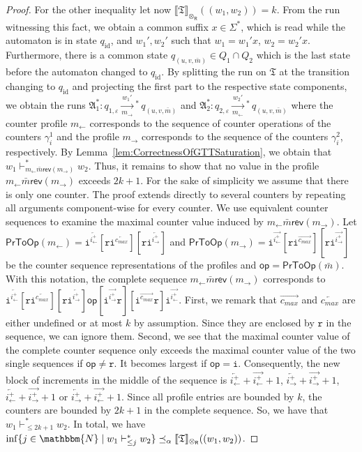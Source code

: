 \documentclass{LMCS}
\newcommand{\apathS}[2][]{\xrightarrow[#1]{#2}\!\!{}^*\,}
\newcommand{\nat}{\mathbbm{N}}
\newcommand{\eps}{\varepsilon}
\newcommand{\automatonA}{\mathfrak A}
\newcommand{\automatonT}{\mathfrak T}
\newcommand{\semantics}[1]{\llbracket#1\rrbracket}
\newcommand{\costlea}[1][\alpha]{\preceq_{#1}}
\newcommand{\ipl}{i^{+}_{\leftarrow}}
\newcommand{\ipr}{i^{+}_{\rightarrow}}
\newcommand{\cmax}{c_{\mathit{max}}}
\newcommand{\configstepsCost}[2][*]{\vdash^{#1}_{#2}}
\newcommand{\configstepsLesserCost}[2][*]{\vdash^{#1}_{\le #2}}
\newcommand{\padprodR}{\otimes_{\mathsf{R}}}
\newcommand{\rl}{m_{\leftarrow}}
\newcommand{\rr}{m_{\rightarrow}}
\newcommand{\rev}{\mathsf{rev}}
\newcommand{\iOp}{\ensuremath{\mathtt{i}}}
\newcommand{\rOp}{\ensuremath{\mathtt{r}}}
\newcommand{\profileToOp}{\mathsf{PrToOp}}
\begin{document}
\begin{proof}
For the other inequality let now $\semantics{\automatonT}_{\padprodR}((w_1,w_2)) = k$. From the run witnessing this fact, we obtain a common suffix $x \in \Sigma^*$, which is read while the automaton is in state $q_{\mathrm{id}}$, and $w_1',w_2'$ such that $w_1 = w_1'x$, $w_2 = w_2'x$. Furthermore, there is a common state $q_{(u,v,\bar m)} \in Q_1 \cap Q_2$ which is the last state before the automaton changed to $q_{\mathrm{id}}$. By splitting the run on $\automatonT$ at the transition changing to $q_{\mathrm{id}}$ and projecting the first part to the respective state components, we obtain the runs $\automatonA^*_1: q_{1,\eps} \apathS[\rr]{w_1'} q_{(u,v,\bar m)}$ and $\automatonA^*_2: q_{2,\eps} \apathS[\rl]{w_2'} q_{(u,v,\bar m)}$ where the counter profile $\rl$ corresponds to the sequence of counter operations of the counters $\gamma^1_i$ and the profile $\rr$ corresponds to the sequence of the counters $\gamma^2_i$, respectively. By Lemma~\ref{lem:CorrectnessOfGTTSaturation}, we obtain that $w_1 \configstepsCost{\rl \bar m \rev(\rr)} w_2$. Thus, it remains to show that no value in the profile $\rl \bar m \rev(\rr)$ exceeds $2k + 1$. For the sake of simplicity we assume that there is only one counter. The proof extends directly to several counters by repeating all arguments component-wise for every counter. We use equivalent counter sequences to examine the maximal counter value induced by $\rl \bar m \rev(\rr)$. Let $\profileToOp(\rl) = \iOp^{\overleftarrow{\ipl}}[\rOp\iOp^{\overleftarrow{\cmax}}][\rOp\iOp^{\overleftarrow{\ipr}}]$ and $\profileToOp(\rr) = \iOp^{\overrightarrow{\ipl}}[\rOp\iOp^{\overrightarrow{\cmax}}][\rOp\iOp^{\overrightarrow{\ipr}}]$ be the counter sequence representations of the profiles and $\mathsf{op} = \profileToOp(\bar m)$. With this notation, the complete sequence $\rl \bar m \rev(\rr)$ corresponds to $\iOp^{\overleftarrow{\ipl}}[\rOp\iOp^{\overleftarrow{\cmax}}][\rOp\iOp^{\overleftarrow{\ipr}}] \mathsf{op} [\iOp^{\overrightarrow{\ipr}}\rOp][\iOp^{\overrightarrow{\cmax}}\rOp]\iOp^{\overrightarrow{\ipl}}$. First, we remark that $\overrightarrow{\cmax}$ and $\overleftarrow{\cmax}$ are either undefined or at most $k$ by assumption. Since they are enclosed by $\rOp$ in the sequence, we can ignore them. Second, we see that the  maximal counter value of the complete counter sequence only exceeds the maximal counter value of the two single sequences if $\mathsf{op} \ne \rOp$. It becomes largest if $\mathsf{op} = \iOp$. Consequently, the new block of increments in the middle of the sequence is $\overleftarrow{\ipl} + \overrightarrow{\ipl} + 1$, $\overleftarrow{\ipr} + \overrightarrow{\ipr} + 1$, $\overleftarrow{\ipl} + \overrightarrow{\ipr} + 1$ or $\overleftarrow{\ipr} + \overrightarrow{\ipl} + 1$. Since all profile entries are bounded by $k$, the counters are bounded by $2k +1$ in the complete sequence. So, we have that $w_1 \configstepsLesserCost{2k +1} w_2$. In total, we have $\inf \{ j \in \nat \mid  w_1 \configstepsLesserCost{j} w_2 \} \costlea \semantics{\automatonT}_{\padprodR}((w_1,w_2))$.
\end{proof}
\end{document}
